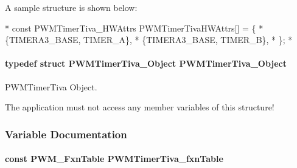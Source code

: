 A sample structure is shown below\-: 
\begin{DoxyCode}
*  \textcolor{keyword}{const} PWMTimerTiva_HWAttrs PWMTimerTivaHWAttrs[] = \{
*      \{TIMERA3\_BASE, TIMER\_A\},
*      \{TIMERA3\_BASE, TIMER\_B\},
*  \};
*  
\end{DoxyCode}
\paragraph[{P\-W\-M\-Timer\-Tiva\-\_\-\-Object}]{\setlength{\rightskip}{0pt plus 5cm}typedef struct {\bf P\-W\-M\-Timer\-Tiva\-\_\-\-Object}  {\bf P\-W\-M\-Timer\-Tiva\-\_\-\-Object}}\label{_p_w_m_timer_tiva_8h_aa113ed38a67720c1fbd892428c1a9952}


P\-W\-M\-Timer\-Tiva Object. 

The application must not access any member variables of this structure! 

\subsubsection{Variable Documentation}
\paragraph[{P\-W\-M\-Timer\-Tiva\-\_\-fxn\-Table}]{\setlength{\rightskip}{0pt plus 5cm}const {\bf P\-W\-M\-\_\-\-Fxn\-Table} P\-W\-M\-Timer\-Tiva\-\_\-fxn\-Table}\label{_p_w_m_timer_tiva_8h_a9635643df3533a0642e7caa819c01a40}
